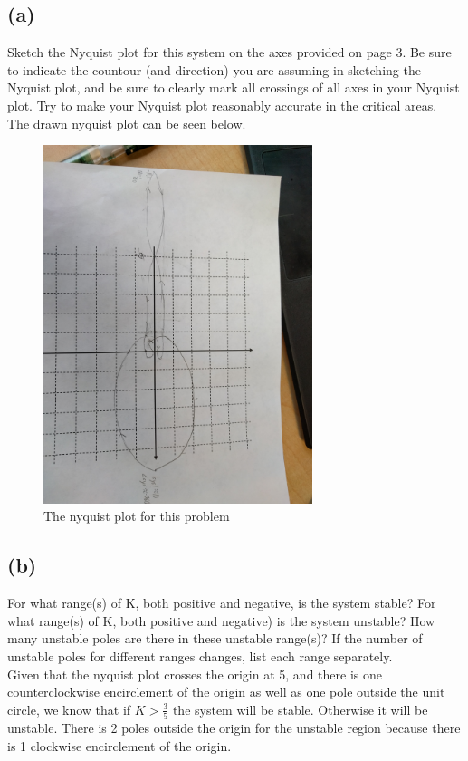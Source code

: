 \documentclass{article}
\begin{document}
\subsection*{(a)}
Sketch the Nyquist plot for this system on the axes provided on page 3. Be sure to indicate the countour (and direction) you are assuming in sketching the Nyquist plot, and be sure to clearly mark all crossings of all axes in your Nyquist plot. Try to make your Nyquist plot reasonably accurate in the critical areas.\\

The drawn nyquist plot can be seen below.
\begin{figure}[H]
    \centering
    \includegraphics[angle=90,width=0.7\textwidth]{PR2_nyquist.jpg}
    \caption{The nyquist plot for this problem}
\end{figure}
\subsection*{(b)}
For what range(s) of K, both positive and negative, is the system stable? For what range(s) of K, both positive and negative) is the system unstable? How many unstable poles are there in these unstable range(s)? If the number of unstable poles for different ranges changes, list each range separately.\\

Given that the nyquist plot crosses the origin at 5, and there is one counterclockwise encirclement of the origin as well as one pole outside the unit circle, we know that if $K>\frac{3}{5}$ the system will be stable. Otherwise it will be unstable. There is 2 poles outside the origin for the unstable region because there is 1 clockwise encirclement of the origin.
\end{document}
